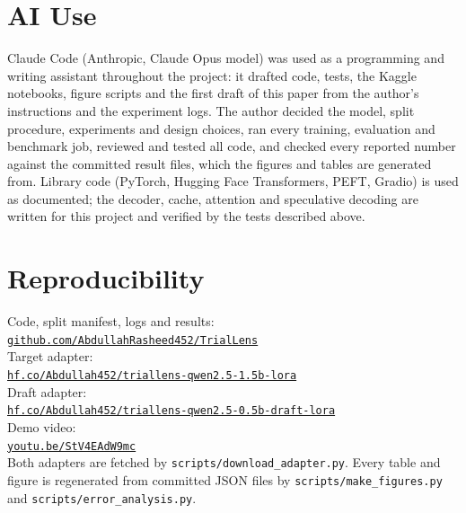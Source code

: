 \documentclass[conference]{IEEEtran}
\begin{document}
\appendices
\section{AI Use}
Claude Code (Anthropic, Claude Opus model) was used as a programming and writing assistant throughout the project: it drafted code, tests, the Kaggle notebooks, figure scripts and the first draft of this paper from the author's instructions and the experiment logs. The author decided the model, split procedure, experiments and design choices, ran every training, evaluation and benchmark job, reviewed and tested all code, and checked every reported number against the committed result files, which the figures and tables are generated from. Library code (PyTorch, Hugging Face Transformers, PEFT, Gradio) is used as documented; the decoder, cache, attention and speculative decoding are written for this project and verified by the tests described above.

\section{Reproducibility}
{\raggedright
Code, split manifest, logs and results:\\ \href{https://github.com/AbdullahRasheed452/TrialLens}{\footnotesize\texttt{github.com/AbdullahRasheed452/TrialLens}}\\[2pt]
Target adapter:\\ \href{https://huggingface.co/Abdullah452/triallens-qwen2.5-1.5b-lora}{\footnotesize\texttt{hf.co/Abdullah452/triallens-qwen2.5-1.5b-lora}}\\[2pt]
Draft adapter:\\ \href{https://huggingface.co/Abdullah452/triallens-qwen2.5-0.5b-draft-lora}{\footnotesize\texttt{hf.co/Abdullah452/triallens-qwen2.5-0.5b-draft-lora}}\\[2pt]
Demo video:\\ \href{https://youtu.be/StV4EAdW9mc}{\footnotesize\texttt{youtu.be/StV4EAdW9mc}}\\[2pt]
Both adapters are fetched by \texttt{scripts/download\_adapter.py}. Every table and figure is regenerated from committed JSON files by \texttt{scripts/make\_figures.py} and \texttt{scripts/error\_analysis.py}.\par}



\end{document}
